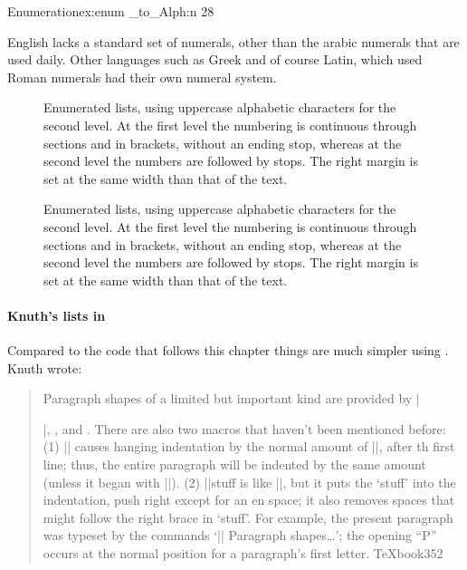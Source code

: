 \begin{texexample}{Enumeration}{ex:enum}
\ExplSyntaxOn
\int_to_Alph:n {28}
\ExplSyntaxOff
\end{texexample}

English lacks a standard set of numerals, other than the arabic numerals that are used daily. Other languages such as Greek and of course Latin, which used Roman numerals  had their own numeral system.  

\begin{figure}
\centering
\fboxrule=2pt
 \caption{Enumerated lists, using uppercase alphabetic characters for the second level. At the first level the numbering is continuous through sections and in brackets, without an ending stop, whereas at the second level the numbers are followed by stops. The right margin is set at the same width than that of the text.}
 \label{fig:woodard}
\end{figure}

\begin{figure}
\centering
\fboxrule=2pt
 \caption{Enumerated lists, using uppercase alphabetic characters for the second level. At the first level the numbering is continuous through sections and in brackets, without an ending stop, whereas at the second level the numbers are followed by stops. The right margin is set at the same width than that of the text.}
 \label{fig:woodard}
\end{figure}

\paragraph{Knuth's lists in \PlainTeX}

Compared to the code that follows this chapter things are much simpler using \PlainTeX. Knuth
wrote:

\begin{quote}
Paragraph shapes of a limited but important kind are provided by |\item|,
, and . There are also two macros that haven't been mentioned
before: (1) |\hang| causes hanging indentation by the normal amount of |\parindent|,
after th first line; thus, the entire paragraph will be indented by the same amount
(unless it began with |\noindent|). (2) |\textindent|{stuff} is like |\indent|, but it puts
the `stuff' into the indentation, push right except for an en space; it also removes spaces
that might follow the right brace in `{stuff}'. For example, the present paragraph
was typeset by the commands `|\textindent{$\bullet$}| Paragraph shapes\ldots'; the
opening \enquote{P} occurs at the normal position for a paragraph's first letter. TeXbook{352}
\end{quote}

